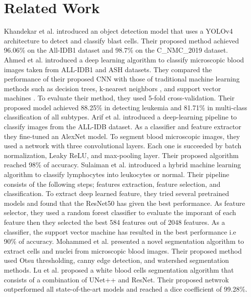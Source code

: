 \documentclass[diagnostics,article,submit,pdftex,moreauthors]{Definitions/mdpi}
\begin{document}
\section{Related Work}
Khandekar et al. \cite{khandekar2021automated} introduced an object detection model that uses a YOLOv4 architecture to detect and classify blast cells. Their proposed method achieved 96.06\% on the All-IDB1 dataset and 98.7\% on the C\_NMC\_2019 dataset. Ahmed et al. \cite{ahmed2019identification} introduced a deep learning algorithm to classify microscopic blood images taken from ALL-IDB1 and ASH datasets. They compared the performance of their proposed CNN with those of traditional machine learning methods such as decision trees, k-nearest neighbors \cite{peterson2009k}, and support vector machines \cite{hearst1998support}. To evaluate their method, they used 5-fold cross-validation. Their proposed model achieved 88.25\% in detecting leukemia and 81.71\% in multi-class classification of all subtypes. Arif et al. \cite{arif2022automatic} introduced a deep-learning pipeline to classify images from the ALL-IDB dataset. As a classifier and feature extractor they fine-tuned an AlexNet \cite{krizhevsky2012imagenet} model. To segment blood microscopic images, they used a network with three convolutional layers. Each one is succeeded by batch normalization, Leaky ReLU, and max-pooling layer. Their proposed algorithm reached 98\% of accuracy. Sulaiman et al. \cite{sulaiman2023resrandsvm} introduced a hybrid machine learning algorithm to classify lymphocytes into leukocytes or normal. Their pipeline consists of the following steps; features extraction, feature selection, and classification. To extract deep learned feature, they tried several pretrained models and found that the ResNet50 has given the best performance. As feature selector, they used a random forest classifier to evaluate the imporant of each feature then they selected the best 584 features out of 2048 features. As a classifier, the support vector machine has resulted in the best performance i.e 90\% of accuracy. Mohammed et al. \cite{mohammed2013chronic} presented a novel segmentation algorithm to extract cells and nuclei from microscopic blood images. Their proposed method used Otsu thresholding, canny edge detection, and watershed segmentation methods. Lu et al. \cite{lu2021wbc} proposed a white blood cells segmentation algorithm that consists of a combination of UNet++ and ResNet. Their proposed netwrok outperformed all state-of-the-art models and reached a dice coefficient of 99.28\%. 
\end{document}

